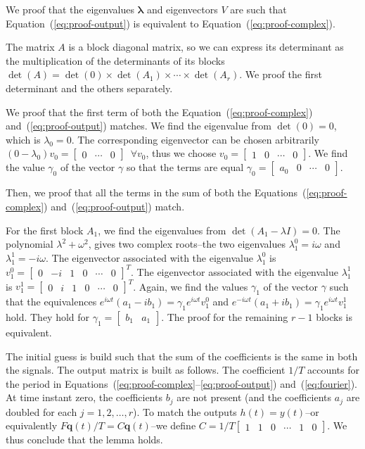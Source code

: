 \documentclass[letterpaper,10pt,conference]{ieeeconf}
\theoremstyle{definition}
\begin{document}
We proof that the eigenvalues $\mathbf{\lambda}$ and eigenvectors $V$ are such that Equation~(\ref{eq:proof-output}) is equivalent to Equation~(\ref{eq:proof-complex}).

The matrix $A$ is a block diagonal matrix, so we can express its determinant as the multiplication of the determinants of its blocks $\det{(A)}=\det{(0)}\times\det{(A_1)}\times\cdots\times\det{(A_r)}$. We proof the first determinant and the others separately.

We proof that the first term of both the Equation~(\ref{eq:proof-complex}) and~(\ref{eq:proof-output}) matches. We find the eigenvalue from $\det(0)=0$, which is $\lambda_0=0$. The corresponding eigenvector can be chosen arbitrarily $(0-\lambda_0)v_0=\begin{bmatrix} 0 & \cdots & 0 \end{bmatrix}\,\,\,\forall v_0$, thus we choose $v_0=\begin{bmatrix}1 & 0 & \cdots & 0\end{bmatrix}$. We find the value $\gamma_0$ of the vector $\gamma$ so that the terms are equal $\gamma_0=\begin{bmatrix}a_0 & 0 & \cdots & 0\end{bmatrix}$. 

Then, we proof that all the terms in the sum of both the Equations~(\ref{eq:proof-complex}) and~(\ref{eq:proof-output}) match. 

For the first block $A_1$, we find the eigenvalues from $\det(A_1-\lambda I)=0$. The polynomial $\lambda^2+\omega^2$, gives two complex roots--the two eigenvalues $\lambda_1^0=i\omega$ and $\lambda_1^1=-i\omega$. The eigenvector associated with the eigenvalue $\lambda_1^0$ is $v_1^0=\begin{bmatrix}0 & -i&1&0&\cdots&0\end{bmatrix}^T$. The eigenvector associated with the eigenvalue $\lambda_1^1$ is $v_1^1=\begin{bmatrix}0&i&1&0&\cdots&0\end{bmatrix}^T$. Again, we find the values $\gamma_1$ of the vector $\gamma$ such that the equivalences $e^{i\omega t}(a_1-ib_1)=\gamma_1 e^{i\omega t}v_1^0$ and $e^{-i\omega t}(a_1+ib_1)=\gamma_1 e^{i\omega t}v_1^1$ hold. They hold for $\gamma_1=\begin{bmatrix}b_1&a_1\end{bmatrix}$. The proof for the remaining $r-1$ blocks is equivalent.

The initial guess is build such that the sum of the coefficients is the same in both the signals. The output matrix is built as follows. The coefficient $1/T$ accounts for the period in Equations~(\ref{eq:proof-complex}--\ref{eq:proof-output}) and~(\ref{eq:fourier}). At time instant zero, the coefficients $b_j$ are not present (and the coefficients $a_j$ are doubled for each $j=1,2,\dots,r$). To match the outputs $h(t)=y(t)$--or equivalently $F\mathbf{q}(t)/T=C\mathbf{q}(t)$--we define $C=1/T\begin{bmatrix}1 & 1 & 0 & \cdots & 1 & 0\end{bmatrix}$. We thus conclude that the lemma holds.
\end{document}

